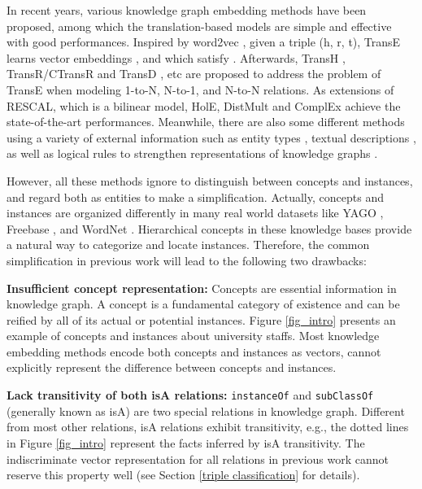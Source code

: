 \documentclass[11pt,a4paper]{article}
\begin{document}
  In recent years, various knowledge graph embedding methods have been proposed, among which the translation-based models 
  are simple and effective with good performances. Inspired by word2vec \cite{Word2Vec}, given a triple 
  (h, r, t), TransE learns vector embeddings ,  and  which satisfy  
  . Afterwards, 
  TransH \cite{TransH}, TransR/CTransR \cite{TransR} and TransD \cite{TransD}, etc are proposed to address 
  the problem of TransE when modeling 1-to-N, N-to-1, and N-to-N relations. 
  As extensions of RESCAL\cite{RESCAL}, which is a bilinear model, HolE\cite{HolE}, DistMult\cite{DistMult}
  and ComplEx\cite{complEx} achieve the state-of-the-art performances.
  Meanwhile, there are also some different 
  methods using a variety of external information such as entity types \cite{DKRL}, 
  textual descriptions \cite{TEKE}, as well as logical rules to strengthen representations of knowledge graphs \cite{Wang2015Knowledge,Shu2016Jointly,Rockt2015Injecting}. 
  
  However, all these methods ignore to distinguish between concepts and instances, and regard both as entities to make a simplification.
  Actually, concepts and instances are organized differently in many real world datasets like YAGO \cite{YAGO}, Freebase \cite{Freebase},
  and WordNet \cite{Wordnet}. Hierarchical concepts in these knowledge bases provide a natural way to categorize and locate instances.
  Therefore, the common simplification in previous work will lead to the following two drawbacks:
  
  \textbf{Insufficient concept representation:} Concepts are essential information in knowledge graph. A concept is a 
  fundamental category of existence \cite{rosch:natural} and can be reified by all of its actual or potential instances. Figure \ref{fig_intro} presents an example of concepts and instances about university staffs.
  Most knowledge embedding methods encode both concepts and instances as vectors, cannot explicitly represent 
  the difference between concepts and instances.
  
  \textbf{Lack transitivity of both isA relations:} \texttt{instanceOf} and \texttt{subClassOf} (generally known as isA) are two special relations in 
  knowledge graph. Different from most other relations, isA relations exhibit transitivity, e.g., the dotted lines in Figure \ref{fig_intro} represent the facts inferred by isA transitivity. 
  The indiscriminate vector representation for all relations in previous work cannot reserve this property well (see Section \ref{triple classification} for details).
  
\end{document}
